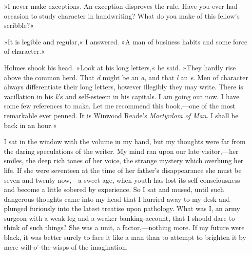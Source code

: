 »I never make exceptions. An exception disproves the rule. Have you ever had occasion to study character in handwriting? What do you make of this fellow's scribble?«

»It is legible and regular,« I answered. »A man of business habits and some force of character.«

Holmes shook his head. »Look at his long letters,« he said. »They hardly rise above the common herd. That \textit{d} might be an \textit{a}, and that \textit{l} an \textit{e}. Men of character always differentiate their long letters, however illegibly they may write. There is vacillation in his \textit{k}'s and self-esteem in his capitals. I am going out now. I have some few references to make. Let me recommend this book,—one of the most remarkable ever penned. It is Winwood Reade's \textit{Martyrdom of Man}. I shall be back in an hour.«

I sat in the window with the volume in my hand, but my thoughts were far from the daring speculations of the writer. My mind ran upon our late visitor,—her smiles, the deep rich tones of her voice, the strange mystery which overhung her life. If she were seventeen at the time of her father's disappearance she must be seven-and-twenty now,—a sweet age, when youth has lost its self-consciousness and become a little sobered by experience. So I sat and mused, until such dangerous thoughts came into my head that I hurried away to my desk and plunged furiously into the latest treatise upon pathology. What was I, an army surgeon with a weak leg and a weaker banking-account, that I should dare to think of such things? She was a unit, a factor,—nothing more. If my future were black, it was better surely to face it like a man than to attempt to brighten it by mere will-o'-the-wisps of the imagination.
